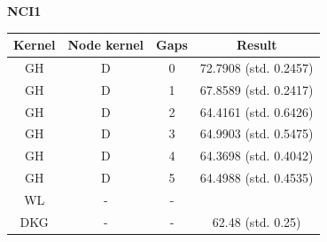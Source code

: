 \documentclass{article}
\begin{document}
\textbf{NCI1}\\
\begin{minipage}{0.6\linewidth}
	\hspace*{-1in}

	\label{fig:nci1}
\end{minipage}
\begin{minipage}[c]{0.5\linewidth}
	
	\centering
	\begin{tabular}{c|c|c|c}
		Kernel & Node kernel & Gaps & Result\\
		\hline
		GH & D & 0 & 72.7908 (std. 0.2457)\\
		GH & D & 1 & 67.8589 (std. 0.2417)\\
		GH & D & 2 & 64.4161 (std. 0.6426)\\
		GH & D & 3 & 64.9903 (std. 0.5475)\\
		GH & D & 4 & 64.3698 (std. 0.4042)\\
		GH & D & 5 & 64.4988 (std. 0.4535)\\
		WL & - & - & \\
		DKG & - & - & 62.48 (std. 0.25)
	\end{tabular}
	\label{table:nci1}
\end{minipage}
\end{document}
